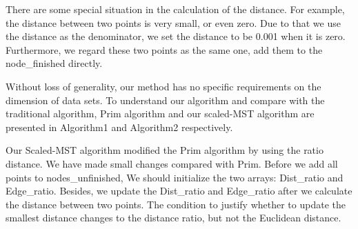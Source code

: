 	  There are some special situation in the calculation of the distance. For example, the distance between two points is very small, or even zero. Due to that we use the distance as the denominator, we set the distance to be 0.001 when it is zero. Furthermore, we regard these two points as the same one, add them to the node\_finished directly.     

	  Without loss of generality, our method has no specific requirements on the dimension of data sets.	To understand our algorithm and compare with the traditional algorithm, Prim algorithm and our scaled-MST algorithm are presented in Algorithm1 and Algorithm2 respectively.

	  Our Scaled-MST algorithm modified the Prim algorithm by using the ratio distance. We have made small changes compared with Prim.  Before we add all points to nodes\_unfinished, We should initialize the two arrays: Dist\_ratio and Edge\_ratio. Besides, we update the Dist\_ratio and Edge\_ratio after we calculate the distance between two points. The condition to justify whether to update the smallest distance changes to the distance ratio, but not the Euclidean distance. 

